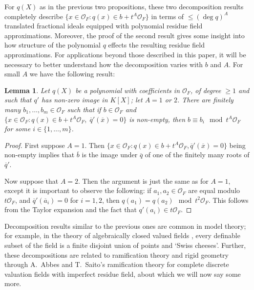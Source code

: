 \documentclass{lmsMODIFIED}
\newtheorem{lemma}[theorem]{Lemma}     %
\newcommand{\roi}{\mathcal{O}}
\newcommand{\res}[1]{\overline{#1}}
\begin{document}
For $q(X)$ as in the previous two propositions, these two decomposition results completely describe $\{x\in\roi_{F}:q(x)\in b+t^A\roi_{F}\}$ in terms of $\le(\deg q)^A$ translated fractional ideals equipped with polynomial residue field approximations. Moreover, the proof of the second result gives some insight into how structure of the polynomial $q$ effects the resulting residue field approximations. For applications beyond those described in this paper, it will be necessary to better understand how the decomposition varies with $b$ and $A$. For small $A$ we have the following result:

\begin{lemma}\label{lemma_depth_1_and_2}
Let $q(X)$ be a polynomial with coefficients in $\roi_{F}$, of degree $\ge1$ and such that $q'$ has non-zero image in $ K [X]$; let $A=1$ or $2$. There are finitely many $b_1,\dots,b_m\in\roi_{F}$ such that if $b\in\roi_{F}$ and $\{x\in\roi_{F}:q(x)\in b+t^A\roi_{F},\;\res{q}'(\res{x})=0\}$ is non-empty, then $b\equiv b_i\mod t^A\roi_{F}$ for some $i\in\{1,\dots,m\}$.
\end{lemma}
\begin{proof}
First suppose $A=1$. Then $\{x\in\roi_{F}:q(x)\in b+t^A\roi_{F},\res{q}'(\res{x})=0\}$ being non-empty implies that $\res{b}$ is the image under $\res{q}$ of one of the finitely many roots of $\res{q}'$.

Now suppose that $A=2$. Then the argument is just the same as for $A=1$, except it is important to observe the following: if $a_1,a_2\in\roi_{F}$ are equal modulo $t\roi_{F}$, and $\res{q}'(\res{a}_i)=0$ for $i=1,2$, then $q(a_1)=q(a_2)\mod t^2\roi_{F}$. This follows from the Taylor expansion and the fact that $q'(a_i)\in t\roi_{F}$.
\end{proof}

Decomposition results similar to the previous ones are common in model theory; for example, in the theory of algebraically closed valued fields \cite{Robinson1977}, every definable subset of the field is a finite disjoint union of points and `Swiss cheeses'. Further, these decompositions are related to ramification theory and rigid geometry through A.~Abbes and T.~Saito's \cite{Abbes2002} \cite{Abbes2003} ramification theory for complete discrete valuation fields with imperfect residue field, about which we will now say some more.
\end{document}
